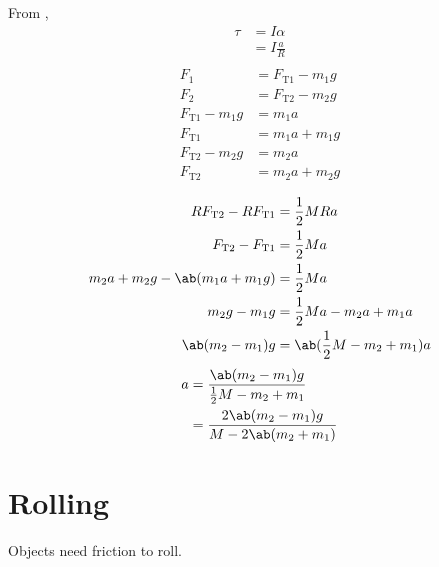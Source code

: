 From ,
\begin{equation*}
    \begin{aligned}
        \tau &= I \alpha \\
        &= I \frac{a}{R} \\
    \end{aligned}
\end{equation*}
\begin{equation}
    \begin{aligned}
        F_1 &= F_\mathrm{T1} - m_1 g \\
        F_2 &= F_\mathrm{T2} - m_2 g \\
        F_\mathrm{T1} - m_1 g &= m_1 a \\
        F_\mathrm{T1} &= m_1 a + m_1 g \\
        F_\mathrm{T2} - m_2 g &= m_2 a \\
        F_\mathrm{T2} &= m_2 a + m_2 g \\
    \end{aligned}
\end{equation}
\begin{equation}
    \begin{aligned}
        R F_\mathrm{T2} - R F_\mathrm{T1} &= \frac{1}{2} M R a \\
        F_\mathrm{T2} - F_\mathrm{T1} &= \frac{1}{2} M a \\
        m_2 a + m_2 g - \ab(m_1 a + m_1 g) &= \frac{1}{2} M a \\
        m_2 g - m_1 g &= \frac{1}{2} M a - m_2 a + m_1 a \\
        \ab(m_2 - m_1) g &= \ab(\frac{1}{2} M - m_2 + m_1) a \\
    \end{aligned}
\end{equation}
\begin{equation}
    \begin{aligned}
        a &= \frac{\ab(m_2 - m_1) g}{\frac{1}{2} M - m_2 + m_1} \\
        &= \frac{2 \ab(m_2 - m_1) g}{M - 2 \ab(m_2 + m_1)}
    \end{aligned}
\end{equation}

\section{Rolling}

Objects need friction to roll.

